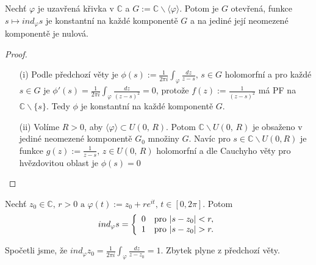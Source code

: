 \begin{theorem}
 Nechť $\varphi$ je uzavřená křivka v $\mathbb{C}$ a $G:=\mathbb{C}\backslash\langle\varphi\rangle$. %
Potom je $G$ otevřená, funkce $s\mapsto ind_{\varphi} s$ je konstantní na každé komponentě $G$ a na jediné její neomezené komponentě je nulová. 
\end{theorem}
\begin{proof}
\begin{itemize}
    \item[(i)] Podle předchozí věty je $\phi(s):=\frac{1}{2\pi i}\int_{\varphi}\frac{dz}{z-s}\text{, }s\in G$  %
    holomorfní a pro každé $s\in G$ je $\phi'(s)=\frac{1}{2\pi i}\int_{\varphi}\frac{dz}{(z-s)^2}=0$, protože $f(z):=\frac{1}{(z-s)^2}$ má PF na $\mathbb{C}\backslash\{s\}$. %
    Tedy $\phi$ je konstantní na každé komponentě $G$.
    \item[(ii)]%
    Volíme $R>0$, aby $\langle\varphi\rangle\subset U(0,\, R)$. Potom $\mathbb{C}\backslash U(0,\, R)$ je obsaženo v jediné neomezené komponentě $G_{0}$ množiny $G$. Navíc pro $s\in\mathbb{C}\backslash U(0,R)$ je funkce $g(z):=\frac{1}{z-s}\text{, }z\in U(0,\, R)$ holomorfní a dle Cauchyho věty pro hvězdovitou oblast %
    je $\phi(s)=0$
\end{itemize}

\end{proof}

\begin{example}
Nechť $z_{0}\in\mathbb{C}\text{, }r>0\text{ a }\varphi(t):=z_{0}+r e^{it}\text{, }t\in [0,2\pi]$. %
Potom $$ind_{\varphi}s=
\twopartdef
{0}{|s-z_{0}|<r,}  %
{1}{|s-z_{0}|>r.}$$ %

Spočetli jsme, že
$ind_{\varphi}z_{0}=\frac{1}{2\pi i}\int_{\varphi}\frac{dz}{z-z_{0}}=1$.
Zbytek plyne z předchozí věty.
\end{example}